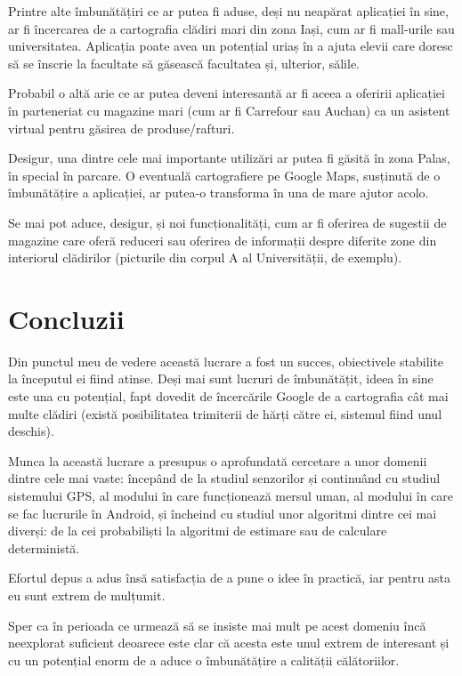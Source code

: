 \documentclass[12pt, a4paper, oneside]{article}
\begin{document}
Printre alte îmbunătățiri ce ar putea fi aduse, deși nu neapărat aplicației în sine, ar fi încercarea de a cartografia clădiri mari din zona Iași, cum ar fi mall-urile sau universitatea. Aplicația poate avea un potențial uriaș în a ajuta elevii care doresc să se înscrie la facultate să găsească facultatea și, ulterior, sălile.

Probabil o altă arie ce ar putea deveni interesantă ar fi aceea a oferirii aplicației în parteneriat cu magazine mari (cum ar fi Carrefour sau Auchan) ca un asistent virtual pentru găsirea de produse/rafturi.

Desigur, una dintre cele mai importante utilizări ar putea fi găsită în zona Palas, în special în parcare. O eventuală cartografiere pe Google Maps, susținută de o îmbunătățire a aplicației, ar putea-o transforma în una de mare ajutor acolo.

Se mai pot aduce, desigur, și noi funcționalități, cum ar fi oferirea de sugestii de magazine care oferă reduceri sau oferirea de informații despre diferite zone din interiorul clădirilor (picturile din corpul A al Universității, de exemplu).

\newpage
\section{Concluzii} \label{Concluzii}
Din punctul meu de vedere această lucrare a fost un succes, obiectivele stabilite la începutul ei fiind atinse. Deși mai sunt lucruri de îmbunătățit, ideea în sine este una cu potențial, fapt dovedit de încercările Google de a cartografia cât mai multe clădiri (există posibilitatea trimiterii de hărți către ei, sistemul fiind unul deschis).

Munca la această lucrare a presupus o aprofundată cercetare a unor domenii dintre cele mai vaste: începând de la studiul senzorilor și continuând cu studiul sistemului GPS, al modului în care funcționează mersul uman, al modului în care se fac lucrurile în Android, și încheind cu studiul unor algoritmi dintre cei mai diverși: de la cei probabiliști la algoritmi de estimare sau de calculare deterministă.

Efortul depus a adus însă satisfacția de a pune o idee în practică, iar pentru asta eu sunt extrem de mulțumit.

Sper ca în perioada ce urmează să se insiste mai mult pe acest domeniu încă neexplorat suficient deoarece este clar că acesta este unul extrem de interesant și cu un potențial enorm de a aduce o îmbunătățire a calității călătoriilor.

\newpage
{}


\nocite{*}
\end{document}
